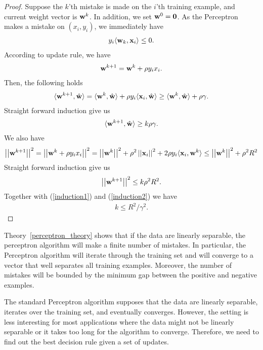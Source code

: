 \begin{proof}
	Suppose the $k$'th mistake is made on the $i$'th training example, and current weight vector is $\mathbf {w}^k$.
	In addition, we set $\mathbf {w}^0=\mathbf {0}$.
	As the Perceptron makes a mistake on $(x_i,y_i)$, we immediately have
	\begin{align*}
		y_i\langle \mathbf {w}_k, \mathbf {x}_i \rangle \le 0.
	\end{align*}
	According to update rule, we have
	\begin{align*}
		\mathbf {w}^{k+1} = \mathbf {w}^{k} + \rho y_ix_i.
	\end{align*}
	Then, the following holds
	\begin{align*}
		\langle \mathbf {w}^{k+1}, \hat{\mathbf {w}} \rangle = \langle \mathbf {w}^k, \hat{\mathbf {w}} \rangle + \rho y_i\langle \mathbf {x}_i, \hat{\mathbf {w}} \rangle \ge \langle \mathbf {w}^k, \hat{\mathbf {w}} \rangle + \rho\gamma.
	\end{align*}
	Straight forward induction give us
	\begin{align}
		\langle \mathbf {w}^{k+1}, \hat{\mathbf {w}} \rangle\ge k\rho\gamma. \label{induction1}
	\end{align}
	We also have
	\begin{align*}
		\left|\left| \mathbf {w}^{k+1} \right|\right|^2 
		= \left|\left| \mathbf {w}^{k} + \rho y_ix_i \right|\right|^2
		= \left|\left| \mathbf {w}^k \right|\right|^2 + \rho^2\left|\left| \mathbf {x}_i \right|\right|^2 + 2\rho y_i\langle \mathbf {x}_i, \mathbf {w}^k \rangle
		\le \left|\left| \mathbf {w}^k \right|\right|^2 + \rho^2R^2
	\end{align*}
	Straight forward induction give us
	\begin{align}
		\left|\left| \mathbf {w}^{k+1} \right|\right|^2\le k\rho^2R^2. \label{induction2}
	\end{align}
	Together with (\ref{induction1}) and (\ref{induction2}) we have
	\begin{align*}
		k\le{R^2}/{\gamma^2}.
	\end{align*}
\end{proof}
Theory~\ref{perceptron_theory} shows that if the data are linearly separable, the perceptron algorithm will make a finite number of mistakes. 
In particular, the Perceptron algorithm will iterate through the training set and will converge to a vector that well separates all training examples.
Moreover, the number of mistakes will be bounded by the minimum gap between the positive and negative examples.

The standard Perceptron algorithm supposes that the data are linearly separable, iterates over the training set, and eventually converges.
However, the setting is less interesting for most applications where the data might not be linearly separable or it takes too long for the algorithm to converge.
Therefore, we need to find out the best decision rule given a set of updates.

